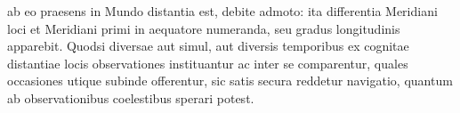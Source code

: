 ab eo praesens in Mundo distantia est, debite admoto: ita differentia Meridiani\protect{} loci et Meridiani\protect{} primi in aequatore\protect{} numeranda, seu gradus longitudinis\protect{} apparebit. Quodsi diversae aut simul, aut diversis temporibus ex cognitae distantiae locis observationes instituantur ac inter se comparentur, quales occasiones utique subinde offerentur, sic satis secura reddetur navigatio, quantum ab observationibus coelestibus sperari potest.\pend 